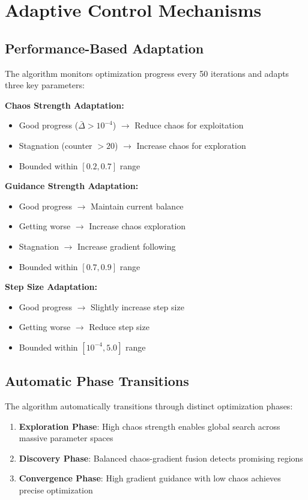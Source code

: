 \documentclass[11pt,a4paper]{article}
\begin{document}
\section{Adaptive Control Mechanisms}

\subsection{Performance-Based Adaptation}

The algorithm monitors optimization progress every 50 iterations and adapts three key parameters:

\textbf{Chaos Strength Adaptation:}
\begin{itemize}
\item Good progress ($\bar{\Delta} > 10^{-4}$) $\rightarrow$ Reduce chaos for exploitation
\item Stagnation (counter $> 20$) $\rightarrow$ Increase chaos for exploration
\item Bounded within $[0.2, 0.7]$ range
\end{itemize}

\textbf{Guidance Strength Adaptation:}
\begin{itemize}
\item Good progress $\rightarrow$ Maintain current balance
\item Getting worse $\rightarrow$ Increase chaos exploration
\item Stagnation $\rightarrow$ Increase gradient following
\item Bounded within $[0.7, 0.9]$ range
\end{itemize}

\textbf{Step Size Adaptation:}
\begin{itemize}
\item Good progress $\rightarrow$ Slightly increase step size
\item Getting worse $\rightarrow$ Reduce step size
\item Bounded within $[10^{-4}, 5.0]$ range
\end{itemize}

\subsection{Automatic Phase Transitions}

The algorithm automatically transitions through distinct optimization phases:

\begin{enumerate}
\item \textbf{Exploration Phase}: High chaos strength enables global search across massive parameter spaces
\item \textbf{Discovery Phase}: Balanced chaos-gradient fusion detects promising regions
\item \textbf{Convergence Phase}: High gradient guidance with low chaos achieves precise optimization
\end{enumerate}
\end{document}

